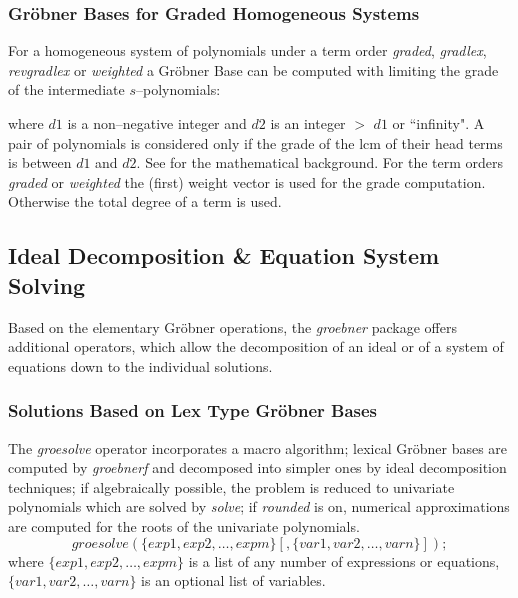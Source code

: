 \subsubsection{Gr\"obner Bases for Graded Homogeneous Systems}

For a homogeneous system of polynomials under a term order
{\it graded}, {\it gradlex}, {\it revgradlex} or {\it weighted}
a Gr\"obner Base can be computed with limiting the grade
of the intermediate $s$--polynomials:
\begin{description}
\item[{\it dd\_groebner}($d1,d2,\{p_1,p_2,\ldots\}$);]
  \hypertarget{operator:DD_GROEBNER}{}
\end{description}
where $d1$ is a non--negative integer and $d2$ is an integer
$>$ $d1$ or ``infinity". A pair of polynomials is considered
only if the grade of the lcm of their head terms is between
$d1$ and $d2$. See \cite{Becker:93} for the mathematical background.
For the term orders {\it graded} or {\it weighted} the (first) weight
vector is used for the grade computation. Otherwise the total
degree of a term is used.

\subsection{Ideal Decomposition \& Equation System Solving}
Based on the elementary Gr\"obner operations, the \emph{groebner} package offers
additional operators, which allow the decomposition of an ideal or of a
system of equations down to the individual solutions.

\subsubsection{Solutions Based on Lex Type Gr\"obner Bases}

 
\hypertarget{operator:GROESOLVE}{}
The \emph{groesolve} operator incorporates a macro algorithm;
lexical Gr\"obner bases are computed by \emph{groebnerf} and decomposed
into simpler ones by ideal decomposition techniques; if algebraically
possible, the problem is reduced to univariate polynomials which are
solved by \emph{solve}; if \emph{rounded} is on, numerical approximations are
computed for the roots of the univariate polynomials.
\[
 groesolve(\{exp1, exp2, \ldots , expm\}[,\{var1, var2, \ldots ,
varn\}]); \]
where $\{exp1, exp2,\ldots , expm\}$ is a list of any number of
expressions or equations, $\{var1, var2, \ldots , varn\}$ is an
optional list of variables.

